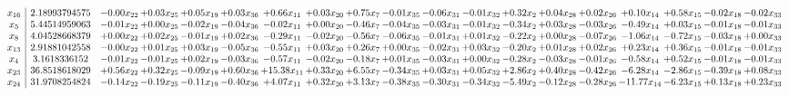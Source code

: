 \documentclass[9pt]{article}
\begin{document}
 \[\begin{array}{c| c c@{\hskip 2pt} c@{\hskip 2pt} c@{\hskip 2pt} c@{\hskip 2pt} c@{\hskip 2pt} c@{\hskip 2pt} c@{\hskip 2pt} c@{\hskip 2pt} c@{\hskip 2pt} c@{\hskip 2pt} c@{\hskip 2pt} c@{\hskip 2pt} c@{\hskip 2pt} c@{\hskip 2pt} c@{\hskip 2pt} c@{\hskip 2pt} c@{\hskip 2pt} }
 x_{16}   &  2.18993794575 & -0.00 x_{22} & +  0.03 x_{25} & +  0.05 x_{19} & +  0.03 x_{36} & +  0.66 x_{11} & +  0.03 x_{20} & +  0.75 x_{7} & -0.01 x_{35} & -0.06 x_{31} & -0.01 x_{32} & +  0.32 x_{2} & +  0.04 x_{28} & +  0.02 x_{26} & +  0.10 x_{14} & +  0.58 x_{15} & -0.02 x_{18} & -0.02 x_{33}\\
 x_{5}   &  5.44514959063 & -0.01 x_{22} & +  0.00 x_{25} & -0.02 x_{19} & -0.04 x_{36} & -0.02 x_{11} & +  0.00 x_{20} & -0.46 x_{7} & -0.04 x_{35} & -0.03 x_{31} & -0.01 x_{32} & -0.34 x_{2} & +  0.03 x_{28} & -0.03 x_{26} & -0.49 x_{14} & +  0.03 x_{15} & -0.01 x_{18} & -0.01 x_{33}\\
 x_{8}   &  4.04528668379 & +  0.00 x_{22} & +  0.02 x_{25} & -0.01 x_{19} & +  0.02 x_{36} & -0.29 x_{11} & -0.02 x_{20} & -0.56 x_{7} & -0.06 x_{35} & -0.01 x_{31} & +  0.01 x_{32} & -0.22 x_{2} & +  0.00 x_{28} & -0.07 x_{26} & -1.06 x_{14} & -0.72 x_{15} & -0.03 x_{18} & +  0.00 x_{33}\\
 x_{13}   &  2.91881042558 & -0.00 x_{22} & +  0.01 x_{25} & +  0.03 x_{19} & -0.05 x_{36} & -0.55 x_{11} & +  0.03 x_{20} & +  0.26 x_{7} & +  0.00 x_{35} & -0.02 x_{31} & +  0.03 x_{32} & -0.20 x_{2} & +  0.01 x_{28} & +  0.02 x_{26} & +  0.23 x_{14} & +  0.36 x_{15} & -0.01 x_{18} & -0.01 x_{33}\\
 x_{4}   &  3.1618336152 & -0.01 x_{22} & -0.01 x_{25} & +  0.02 x_{19} & -0.03 x_{36} & -0.57 x_{11} & -0.02 x_{20} & -0.18 x_{7} & +  0.01 x_{35} & -0.03 x_{31} & +  0.00 x_{32} & -0.28 x_{2} & -0.03 x_{28} & -0.01 x_{26} & -0.58 x_{14} & +  0.52 x_{15} & -0.01 x_{18} & -0.01 x_{33}\\
 x_{23}   &  36.8518618029 & +  0.56 x_{22} & +  0.32 x_{25} & -0.09 x_{19} & +  0.60 x_{36} & + 15.38 x_{11} & +  0.33 x_{20} & +  6.55 x_{7} & -0.34 x_{35} & +  0.03 x_{31} & +  0.05 x_{32} & +  2.86 x_{2} & +  0.40 x_{28} & -0.42 x_{26} & -6.28 x_{14} & -2.86 x_{15} & -0.39 x_{18} & +  0.08 x_{33}\\
 x_{24}   &  31.9708254824 & -0.14 x_{22} & -0.19 x_{25} & -0.11 x_{19} & -0.40 x_{36} & +  4.07 x_{11} & +  0.32 x_{20} & +  3.13 x_{7} & -0.38 x_{35} & -0.30 x_{31} & -0.34 x_{32} & -5.49 x_{2} & -0.12 x_{28} & -0.28 x_{26} & -11.77 x_{14} & -6.23 x_{15} & +  0.13 x_{18} & +  0.23 x_{33}\\

\end{array}\]
\end{document}
